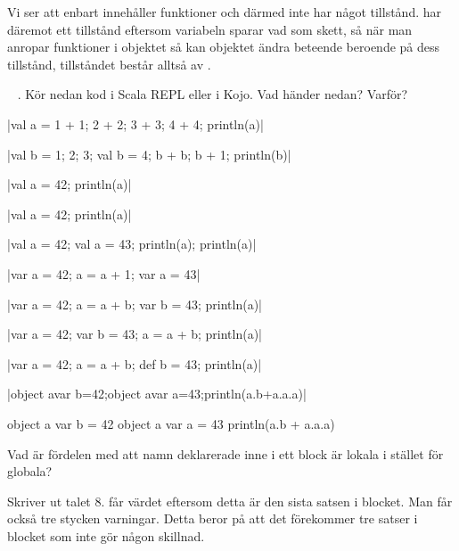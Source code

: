 \SubtaskSolved  Vi ser att  enbart innehåller funktioner och därmed inte har något tillstånd.  har däremot ett tillstånd eftersom variabeln  sparar vad som skett, så när man anropar funktioner i objektet så kan objektet ändra beteende beroende på dess tillstånd, tillståndet består alltså av .



\QUESTEND










\QUESTBEGIN

\Task  \what~ . Kör nedan kod i Scala REPL eller i Kojo. Vad händer nedan? Varför?

\Subtask \code|val a = {1 + 1; 2 + 2; 3 + 3; 4 + 4}; println(a)|

\Subtask \code|val b = {1; 2; 3; {val b = 4; b + b; b + 1}}; println(b)|

\Subtask \code|{val a = 42; println(a)}|

\Subtask \code|{val a = 42}; println(a)|

\Subtask \code|{val a = 42; {val a = 43; println(a)}; println(a)}|

\Subtask \code|{var a = 42; {a = a + 1}; var a = 43}|

\Subtask \code|{var a = 42; {a = a + b; var b = 43}; println(a)}|

\Subtask \code|{var a = 42; {var b = 43; a = a + b}; println(a)}|

\Subtask \code|{var a = 42; {a = a + b; def b = 43}; println(a)}|

\Subtask \code|{object a{var b=42;object a{var a=43}};println(a.b+a.a.a)}|

\Subtask

\begin{Code}
{
  object a {
    var b = 42
    object a {
      var a = 43
    }
  }
  println(a.b + a.a.a)
}
\end{Code}

\Subtask Vad är fördelen med att namn deklarerade inne i ett block är lokala i stället för globala?


\SOLUTION


\TaskSolved \what


\SubtaskSolved  Skriver ut talet 8.  får värdet  eftersom detta är den sista satsen i blocket. Man får också tre stycken varningar. Detta beror på att det förekommer tre satser i blocket som inte gör någon skillnad.

